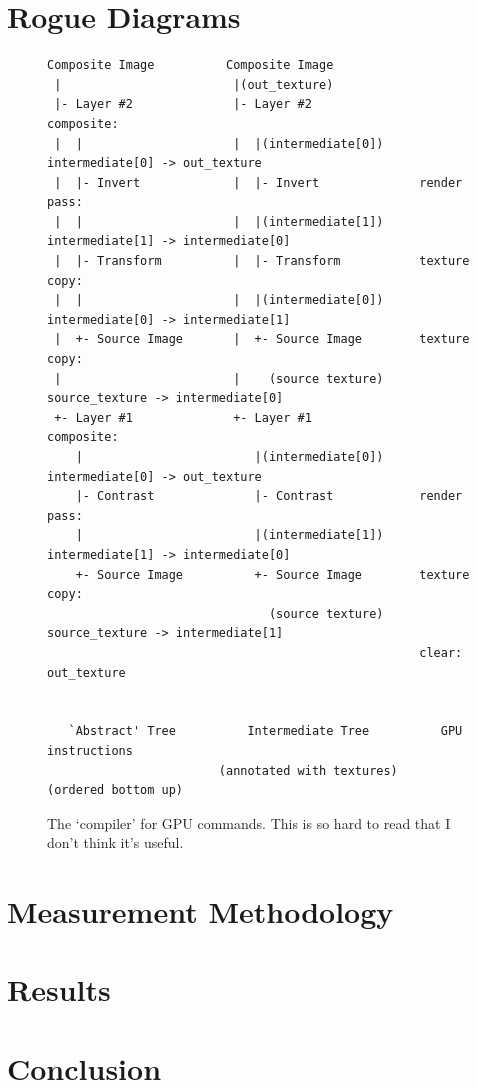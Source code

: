 \documentclass[12pt]{article}
\begin{document}
\pagebreak

\section{Rogue Diagrams}

\begin{figure}
        \begin{verbatim}
Composite Image          Composite Image
 |                        |(out_texture)
 |- Layer #2              |- Layer #2               composite:
 |  |                     |  |(intermediate[0])       intermediate[0] -> out_texture
 |  |- Invert             |  |- Invert              render pass:
 |  |                     |  |(intermediate[1])       intermediate[1] -> intermediate[0]
 |  |- Transform          |  |- Transform           texture copy:
 |  |                     |  |(intermediate[0])       intermediate[0] -> intermediate[1]
 |  +- Source Image       |  +- Source Image        texture copy:
 |                        |    (source texture)       source_texture -> intermediate[0]
 +- Layer #1              +- Layer #1               composite:
    |                        |(intermediate[0])       intermediate[0] -> out_texture
    |- Contrast              |- Contrast            render pass:
    |                        |(intermediate[1])       intermediate[1] -> intermediate[0]
    +- Source Image          +- Source Image        texture copy:
                               (source texture)       source_texture -> intermediate[1]
                                                    clear: out_texture


   `Abstract' Tree          Intermediate Tree          GPU instructions
                        (annotated with textures)     (ordered bottom up)
        \end{verbatim}
    \caption{The `compiler' for GPU commands.  This is so hard to read that I don't think it's
    useful.}\label{fig:gpu-cmd-gen}
\end{figure}






\pagebreak

\section{Measurement Methodology}

\section{Results}

\section{Conclusion}



\pagebreak

\begin{thebibliography}{99}
\end{thebibliography}
\end{document}
